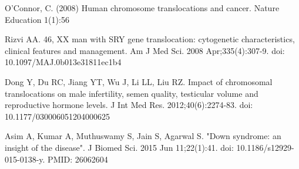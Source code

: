 \documentclass[a4paper,12pt]{article}
\begin{document}
\begin{thebibliography}{300}
O'Connor, C. (2008) Human chromosome translocations and cancer. Nature Education 1(1):56

Rizvi AA. 46, XX man with SRY gene translocation: cytogenetic characteristics, clinical features and management. Am J Med Sci. 2008 Apr;335(4):307-9. doi: 10.1097/MAJ.0b013e31811ec1b4

Dong Y, Du RC, Jiang YT, Wu J, Li LL, Liu RZ. Impact of chromosomal translocations on male infertility, semen quality, testicular volume and reproductive hormone levels. J Int Med Res. 2012;40(6):2274-83. doi: 10.1177/030006051204000625

Asim A, Kumar A, Muthuswamy S, Jain S, Agarwal S. "Down syndrome: an insight of the disease". J Biomed Sci. 2015 Jun 11;22(1):41. doi: 10.1186/s12929-015-0138-y. PMID: 26062604

\end{thebibliography}
\end{document}
